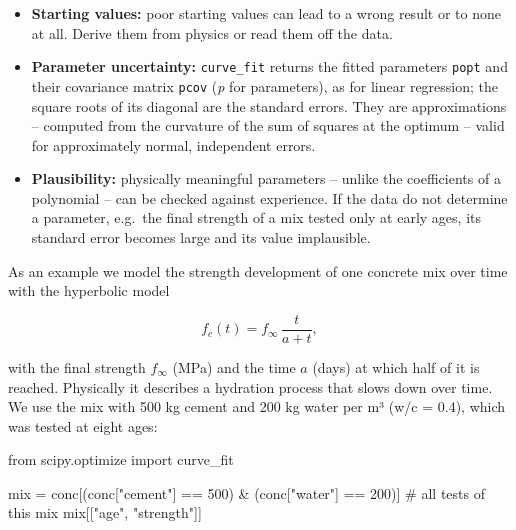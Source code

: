 \documentclass[
  letterpaper,
  DIV=11,
  numbers=noendperiod]{scrreprt}
\newenvironment{Shaded}{\begin{snugshade}}{\end{snugshade}}
\newcommand{\CommentTok}[1]{\textcolor[rgb]{0.37,0.37,0.37}{#1}}
\newcommand{\DecValTok}[1]{\textcolor[rgb]{0.68,0.00,0.00}{#1}}
\newcommand{\ImportTok}[1]{\textcolor[rgb]{0.00,0.46,0.62}{#1}}
\newcommand{\NormalTok}[1]{\textcolor[rgb]{0.00,0.23,0.31}{#1}}
\newcommand{\OperatorTok}[1]{\textcolor[rgb]{0.37,0.37,0.37}{#1}}
\newcommand{\StringTok}[1]{\textcolor[rgb]{0.13,0.47,0.30}{#1}}
\providecommand{\tightlist}{%
  \setlength{\itemsep}{0pt}\setlength{\parskip}{0pt}}\usepackage{longtable,booktabs,array}
\begin{document}
\begin{tcolorbox}[enhanced jigsaw, left=2mm, title=\textcolor{quarto-callout-tip-color}{\faLightbulb}\hspace{0.5em}{Engineering practice: fitting physical models}, opacityback=0, breakable, rightrule=.15mm, arc=.35mm, toptitle=1mm, colbacktitle=quarto-callout-tip-color!10!white, opacitybacktitle=0.6, coltitle=black, colframe=quarto-callout-tip-color-frame, bottomrule=.15mm, leftrule=.75mm, bottomtitle=1mm, titlerule=0mm, toprule=.15mm, colback=white]

\begin{itemize}
\tightlist
\item
  \textbf{Starting values:} poor starting values can lead to a wrong
  result or to none at all. Derive them from physics or read them off
  the data.
\item
  \textbf{Parameter uncertainty:} \texttt{curve\_fit} returns the fitted
  parameters \texttt{popt} and their covariance matrix \texttt{pcov}
  (\emph{p} for parameters), as for linear regression; the square roots
  of its diagonal are the standard errors. They are approximations --
  computed from the curvature of the sum of squares at the optimum --
  valid for approximately normal, independent errors.
\item
  \textbf{Plausibility:} physically meaningful parameters -- unlike the
  coefficients of a polynomial -- can be checked against experience. If
  the data do not determine a parameter, e.g.~the final strength of a
  mix tested only at early ages, its standard error becomes large and
  its value implausible.
\end{itemize}

\end{tcolorbox}

As an example we model the strength development of one concrete mix over
time with the hyperbolic model

\[f_c(t) = f_\infty \, \frac{t}{a + t},\]

with the final strength \(f_\infty\) (MPa) and the time \(a\) (days) at
which half of it is reached. Physically it describes a hydration process
that slows down over time. We use the mix with 500 kg cement and 200 kg
water per m³ (w/c = 0.4), which was tested at eight ages:

\begin{Shaded}
\begin{Highlighting}[]
\ImportTok{from}\NormalTok{ scipy.optimize }\ImportTok{import}\NormalTok{ curve\_fit}

\NormalTok{mix }\OperatorTok{=}\NormalTok{ conc[(conc[}\StringTok{"cement"}\NormalTok{] }\OperatorTok{==} \DecValTok{500}\NormalTok{) }\OperatorTok{\&}\NormalTok{ (conc[}\StringTok{"water"}\NormalTok{] }\OperatorTok{==} \DecValTok{200}\NormalTok{)]   }\CommentTok{\# all tests of this mix}
\NormalTok{mix[[}\StringTok{"age"}\NormalTok{, }\StringTok{"strength"}\NormalTok{]]}
\end{Highlighting}
\end{Shaded}
\end{document}
